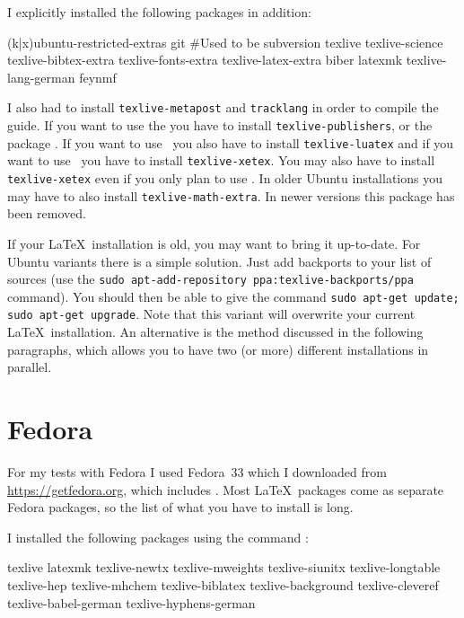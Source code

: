 I explicitly installed the following packages in addition:
\begin{bashlisting}
(k|x)ubuntu-restricted-extras
git #Used to be subversion
texlive
texlive-science
texlive-bibtex-extra
texlive-fonts-extra
texlive-latex-extra
biber
latexmk
texlive-lang-german
feynmf
\end{bashlisting}
I also had to install \texttt{texlive-metapost} and \texttt{tracklang} in order to compile the guide.
If you want to use the  you have to install \texttt{texlive-publishers},
or the package .
If you want to use \LuaLaTeX\ you also have to install \texttt{texlive-luatex}
and if you want to use \XeLaTeX\ you have to install \texttt{texlive-xetex}.
You may also have to install \texttt{texlive-xetex} even if you only plan to use \LuaLaTeX.
In older Ubuntu installations you may have to also install \texttt{texlive-math-extra}.
In newer versions this package has been removed.

If your \LaTeX\ installation is old, you may want to bring it up-to-date.
For Ubuntu variants there is a simple solution.
Just add \TeXLive backports to your list of sources
(use the \texttt{sudo apt-add-repository ppa:texlive-backports/ppa} command).
You should then be able to give the command
\texttt{sudo apt-get update; sudo apt-get upgrade}.
Note that this variant will overwrite your current
\LaTeX\ installation.
An alternative is the method discussed in the following paragraphs,
which allows you to have two (or more) different installations in parallel.


\section{Fedora}%
\label{sec:app:fedora}

For my tests with Fedora I used Fedora~33 which I downloaded from
\url{https://getfedora.org},
which includes .
Most \LaTeX\ packages come as separate Fedora packages,
so the list of what you have to install is long.

I installed the following packages using the command :
\begin{bashlisting}
texlive
latexmk
texlive-newtx
texlive-mweights
texlive-siunitx
texlive-longtable
texlive-hep
texlive-mhchem
texlive-biblatex
texlive-background
texlive-cleveref
texlive-babel-german
texlive-hyphens-german
\end{bashlisting}

